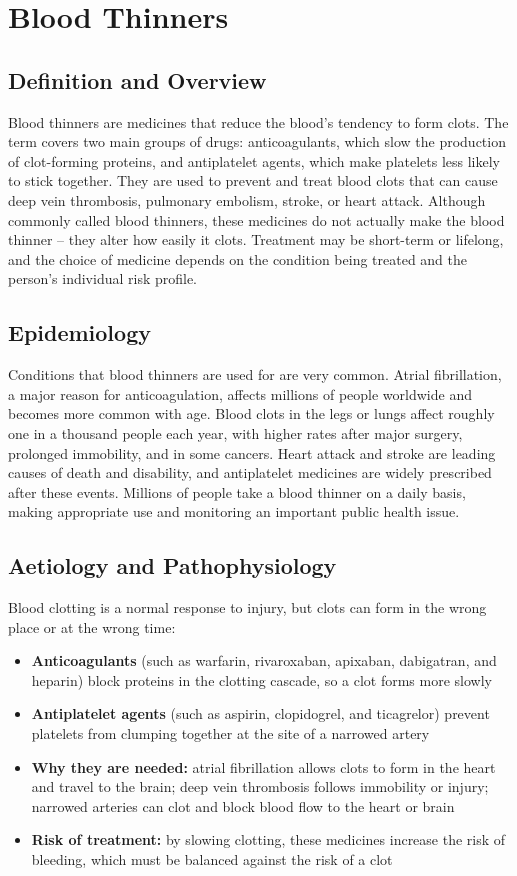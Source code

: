 \chapter{Blood Thinners}

\section*{Definition and Overview}
Blood thinners are medicines that reduce the blood's tendency to form clots. The term covers two main groups of drugs: anticoagulants, which slow the production of clot-forming proteins, and antiplatelet agents, which make platelets less likely to stick together. They are used to prevent and treat blood clots that can cause deep vein thrombosis, pulmonary embolism, stroke, or heart attack. Although commonly called blood thinners, these medicines do not actually make the blood thinner -- they alter how easily it clots. Treatment may be short-term or lifelong, and the choice of medicine depends on the condition being treated and the person's individual risk profile.

\section*{Epidemiology}
Conditions that blood thinners are used for are very common. Atrial fibrillation, a major reason for anticoagulation, affects millions of people worldwide and becomes more common with age. Blood clots in the legs or lungs affect roughly one in a thousand people each year, with higher rates after major surgery, prolonged immobility, and in some cancers. Heart attack and stroke are leading causes of death and disability, and antiplatelet medicines are widely prescribed after these events. Millions of people take a blood thinner on a daily basis, making appropriate use and monitoring an important public health issue.

\section*{Aetiology and Pathophysiology}
Blood clotting is a normal response to injury, but clots can form in the wrong place or at the wrong time:

\begin{itemize}
    \item \textbf{Anticoagulants} (such as warfarin, rivaroxaban, apixaban, dabigatran, and heparin) block proteins in the clotting cascade, so a clot forms more slowly
    \item \textbf{Antiplatelet agents} (such as aspirin, clopidogrel, and ticagrelor) prevent platelets from clumping together at the site of a narrowed artery
    \item \textbf{Why they are needed:} atrial fibrillation allows clots to form in the heart and travel to the brain; deep vein thrombosis follows immobility or injury; narrowed arteries can clot and block blood flow to the heart or brain
    \item \textbf{Risk of treatment:} by slowing clotting, these medicines increase the risk of bleeding, which must be balanced against the risk of a clot
\end{itemize}

